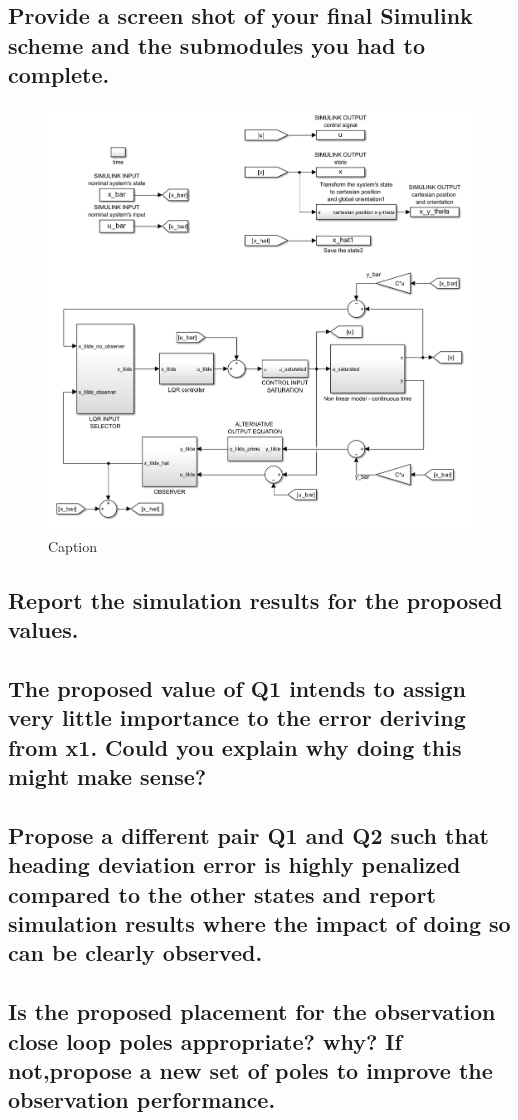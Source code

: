 \subsection{Provide a screen shot of your final Simulink scheme and the submodules you had to complete.}
\begin{figure}[H]
    \centering
    \includegraphics[width = 0.8\linewidth]{Latex report/image/ex2Simulink.png}
    \caption{Caption}
    \label{fig:ex2Simulink}
\end{figure}


\subsection{Report the simulation results for the proposed values.}


\subsection{The proposed value of Q1 intends to assign very little importance to the error deriving from x1. Could you explain why doing this might make sense?}


\subsection{Propose a different pair Q1 and Q2 such that heading deviation error is highly penalized compared to the other states and report simulation results where the impact of doing so can be clearly observed.}


\subsection{Is the proposed placement for the observation close loop poles appropriate? why? If not,propose a new set of poles to improve the observation performance.}